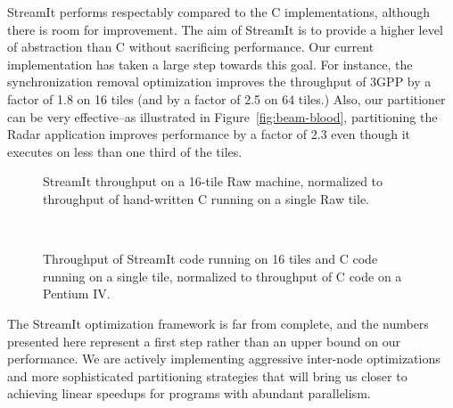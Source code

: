 StreamIt performs respectably compared to the C implementations,
although there is room for improvement.  The aim of StreamIt is to
provide a higher level of abstraction than C without sacrificing
performance.  Our current implementation has taken a large step
towards this goal.  For instance, the synchronization removal
optimization improves the throughput of 3GPP by a factor of 1.8 on 16
tiles (and by a factor of 2.5 on 64 tiles.)  Also, our partitioner can
be very effective--as illustrated in Figure~\ref{fig:beam-blood},
partitioning the Radar application improves performance by a factor
of 2.3 even though it executes on less than one third of the tiles.

\begin{figure*}[!t]
\centering
\begin{minipage}{3.0in}
\centering
{}
\caption{\protect\small StreamIt throughput on a 16-tile Raw machine,
normalized to throughput of hand-written C running on a single Raw
tile.  \protect\label{fig:compare-raw}}
\end{minipage}
~
\hspace{0.1in}
\begin{minipage}{3.0in}
\centering
{}
\caption{Throughput of StreamIt code running on 16 tiles and C code
running on a single tile, normalized to throughput of C code on a
Pentium IV. \protect\label{fig:compare-pentium}}
\end{minipage}
\end{figure*}

The StreamIt optimization framework is far from complete, and the
numbers presented here represent a first step rather than an upper
bound on our performance.  We are actively implementing aggressive
inter-node optimizations and more sophisticated partitioning
strategies that will bring us closer to achieving linear speedups for
programs with abundant parallelism.

